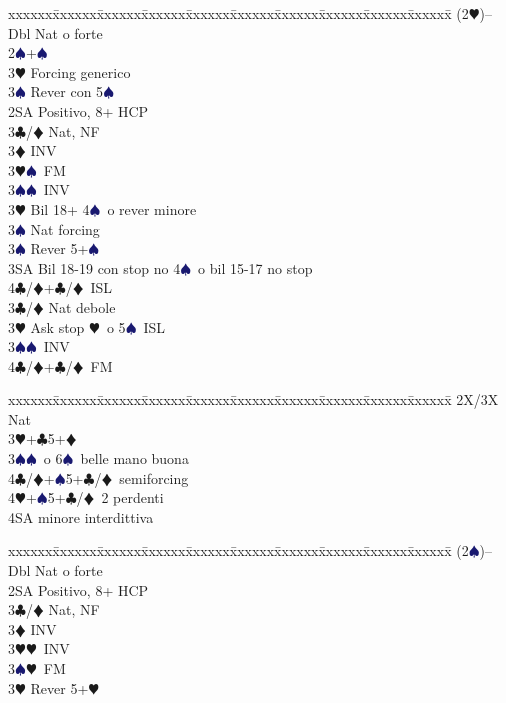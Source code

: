 \documentclass[a4paper,italian]{article}
\newcommand{\BC}{\textcolor{OliveGreen}{$\clubsuit$}}
\newcommand{\BD}{\textcolor{RedOrange}{$\vardiamondsuit$}}
\newcommand{\BH}{\textcolor{Red2}{$\varheartsuit${}}}
\newcommand{\BS}{\textcolor{MidnightBlue}{$\spadesuit${}}}
\newenvironment{bidtable}
{\begin{tabbing}

    xxxxxx\=xxxxxx\=xxxxxx\=xxxxxx\=xxxxxx\=xxxxxx\=xxxxxx\=xxxxxx\=xxxxxx\=xxxxxx\=\kill}
{\end{tabbing} }%
\begin{document}
\begin{multicols}{2}
    \begin{bidtable}
        (2\BH)--\\
        Dbl \> Nat o forte\+\\
        2\BS{}+\BS\+\\
        3\BH\> Forcing generico\\
        3\BS\> Rever con 5\BS\-\\
        2SA\> Positivo, 8+ HCP\+\\
        3\BC/\BD \> Nat, NF\+\\
        3\BD\> INV\\
        3\BH{}\BS\ FM\\
        3\BS{}\BS\ INV\-\\
        3\BH\> Bil 18+ 4\BS\ o rever minore\+\\
        3\BS\> Nat forcing\-\\
        3\BS\> Rever 5+\BS\\
        3SA\> Bil 18-19 con stop no 4\BS\ o bil 15-17 no stop\\
        4\BC/\BD{}+\BC/\BD\ ISL\-\\
        3\BC/\BD\> Nat debole\\
        3\BH\> Ask stop \BH\ o 5\BS\ ISL\\
        3\BS{}\BS\ INV\\
        4\BC/\BD{}+\BC/\BD\ FM
    \end{bidtable}
    \begin{bidtable}
        2X/3X\> Nat\\
        3\BH{}+\BC5+\BD\\
        3\BS{}\BS\ o 6\BS\ belle mano buona\\
        4\BC/\BD{}+\BS5+\BC/\BD\ semiforcing\\
        4\BH{}+\BS5+\BC/\BD\ 2 perdenti\\
        4SA minore interdittiva
    \end{bidtable}
    \begin{bidtable}
        (2\BS)--\\
        Dbl \> Nat o forte\+\\
        2SA\> Positivo, 8+ HCP\+\\
        3\BC/\BD \> Nat, NF\+\\
        3\BD\> INV\\
        3\BH{}\BH\ INV\\
        3\BS{}\BH\ FM\-\\
        3\BH\> Rever 5+\BH\\

\end{bidtable}
\end{multicols}
\end{document}

